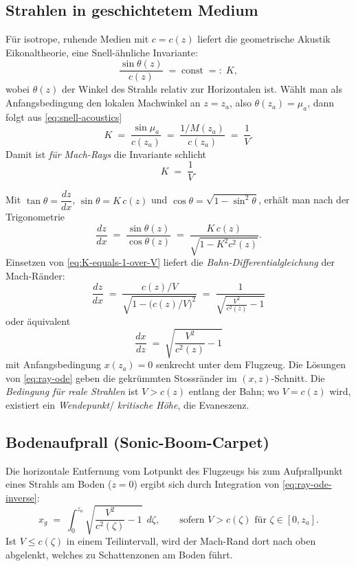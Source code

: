 \subsection{Strahlen in geschichtetem Medium}
Für isotrope, ruhende Medien mit $c=c(z)$ liefert die geometrische
Akustik Eikonaltheorie, eine Snell-ähnliche Invariante:
\begin{equation}
    \frac{\sin\theta(z)}{c(z)} \;=\; \text{const} \;=:\; K ,
    \label{eq:snell-acoustics}
\end{equation}
wobei $\theta(z)$ der Winkel des Strahls relativ zur Horizontalen ist.
Wählt man als Anfangsbedingung den lokalen Machwinkel an $z=z_a$,
also $\theta(z_a)=\mu_a$, dann folgt aus \eqref{eq:snell-acoustics}
\[
    K \;=\; \frac{\sin\mu_a}{c(z_a)} \;=\; \frac{1/M(z_a)}{c(z_a)} \;=\; \frac{1}{V}.
\]
Damit ist \emph{für Mach-Rays} die Invariante schlicht
\begin{equation}
    K \;=\; \frac{1}{V}.
    \label{eq:K-equals-1-over-V}
\end{equation}

Mit $\tan\theta = \dfrac{dz}{dx}$, $\sin\theta = K\,c(z)$ und
$\cos\theta = \sqrt{1 - \sin^2\theta}$,
erhält man nach der Trigonometrie
\begin{equation}
    \frac{dz}{dx} \;=\; \frac{\sin\theta(z)}{\cos\theta(z)} \;=\;
    \frac{K\,c(z)}{\sqrt{1 - K^2 c^2(z)}}.
\end{equation}
Einsetzen von \eqref{eq:K-equals-1-over-V} liefert die
\emph{Bahn-Differentialgleichung} der Mach-Ränder:
\begin{equation}
    \quad
    \frac{dz}{dx} \;=\; \frac{c(z)/V}{\sqrt{1 - \big(c(z)/V\big)^2}}
    \;=\; \frac{1}{\sqrt{\frac{V^2}{c^2(z)} - 1}}
    \quad
    \label{eq:ray-ode}
\end{equation}
oder äquivalent
\begin{equation}
    \quad
    \frac{dx}{dz} \;=\; \sqrt{\frac{V^2}{c^2(z)} - 1}
    \quad
    \label{eq:ray-ode-inverse}
\end{equation}
mit Anfangsbedingung $x(z_a)=0$ senkrecht unter dem Flugzeug.
Die Lösungen von \eqref{eq:ray-ode} geben die gekrümmten Stossränder
im $(x,z)$-Schnitt.
Die \emph{Bedingung für reale Strahlen} ist $V>c(z)$ entlang der Bahn;
wo $V=c(z)$ wird, existiert ein \emph{Wendepunkt}/
\emph{kritische Höhe}, die Evaneszenz.

\subsection{Bodenaufprall (Sonic-Boom-Carpet)}
Die horizontale Entfernung vom Lotpunkt des Flugzeugs bis zum
Aufprallpunkt eines Strahls am Boden ($z=0$) ergibt sich durch
Integration von \eqref{eq:ray-ode-inverse}:
\begin{equation}
    \quad
    x_g \;=\; \int_{0}^{z_a} \sqrt{\frac{V^2}{c^2(\zeta)} - 1}\;\, d\zeta,
    \qquad \text{sofern } V>c(\zeta) \text{ für } \zeta\in[0,z_a].
    \quad
    \label{eq:ground-range}
\end{equation}
Ist $V\le c(\zeta)$ in einem Teilintervall, wird der Mach-Rand dort
nach oben abgelenkt, welches zu Schattenzonen am Boden führt.

